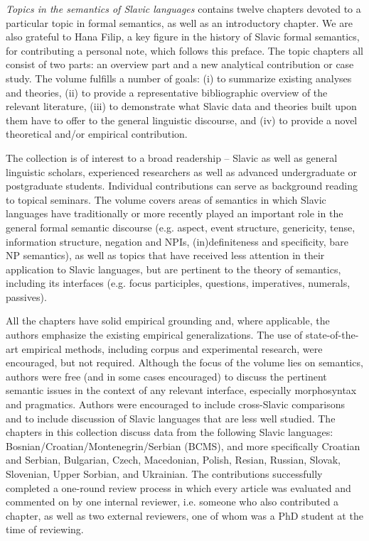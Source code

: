 \begin{refsection}

\textit{Topics in the semantics of Slavic languages} contains twelve chapters devoted to a particular topic in formal semantics, as well as an introductory chapter. We are also grateful to Hana Filip, a key figure in the history of Slavic formal semantics, for contributing a personal note, which follows this preface. The topic chapters all consist of two parts: an overview part and a new analytical contribution or case study. The volume fulfills a number of goals: (i) to summarize existing analyses and theories, (ii) to provide a representative bibliographic overview of the relevant literature, (iii) to demonstrate what Slavic data and theories built upon them have to offer to the general linguistic discourse, and (iv) to provide a novel theoretical and/or empirical contribution. 

The collection is of interest to a broad readership -- Slavic as well as general linguistic scholars, experienced researchers as well as advanced undergraduate or postgraduate students. Individual contributions can serve as background reading to topical seminars. The volume covers areas of semantics in which Slavic languages have traditionally or more recently played an important role in the general formal semantic discourse (e.g. aspect, event structure, genericity, tense, information structure, negation and NPIs, (in)definiteness and specificity, bare NP semantics), as well as topics that have received less attention in their application to Slavic languages, but are pertinent to the theory of semantics, including its interfaces (e.g. focus participles, questions, imperatives, numerals, passives).   

All the chapters have solid empirical grounding and, where applicable, the authors emphasize the existing empirical generalizations. The use of state-of-the-art empirical methods, including corpus and experimental research, were encouraged, but not required. Although the focus of the volume lies on semantics, authors were free (and in some cases encouraged) to discuss the pertinent semantic issues in the context of any relevant interface, especially morphosyntax and pragmatics. Authors were encouraged to include cross-Slavic comparisons and to include discussion of Slavic languages that are less well studied. The chapters in this collection discuss data from the following Slavic languages: Bosnian/Croatian/Montenegrin/Serbian (BCMS), and more specifically Croatian and Serbian, Bulgarian, Czech, Macedonian, Polish, Resian, Russian, Slovak, Slovenian, Upper Sorbian, and Ukrainian. The contributions successfully completed a one-round review process in which every article was evaluated and commented on by one internal reviewer, i.e. someone who also contributed a chapter, as well as two external reviewers, one of whom was a PhD student at the time of reviewing.


\end{refsection}
